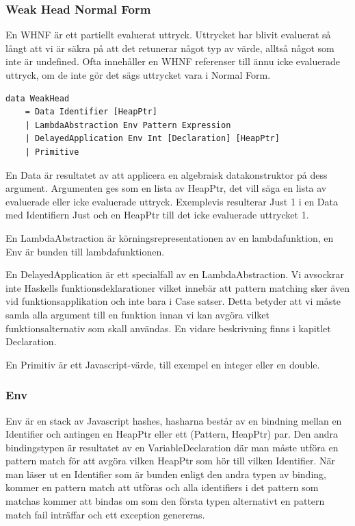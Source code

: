 \subsubsection{Weak Head Normal Form}
En WHNF är ett partiellt evaluerat uttryck. Uttrycket har blivit evaluerat så långt att vi är säkra på att det retunerar något typ av värde, alltså något som inte är undefined. Ofta innehåller en WHNF referenser till ännu icke evaluerade uttryck, om de inte gör det sägs uttrycket vara i Normal Form.

\begin{lstlisting}
data WeakHead 
    = Data Identifier [HeapPtr]
    | LambdaAbstraction Env Pattern Expression
    | DelayedApplication Env Int [Declaration] [HeapPtr]
    | Primitive
\end{lstlisting}

En Data är resultatet av att applicera en algebraisk datakonstruktor på dess argument. Argumenten ges som en lista av HeapPtr, det vill säga en lista av evaluerade eller icke evaluerade uttryck. Exemplevis resulterar Just 1 i en Data med Identifiern Just och en HeapPtr till det icke evaluerade uttrycket 1.

En LambdaAbstraction är körningsrepresentationen av en lambdafunktion, en Env är bunden till lambdafunktionen.

En DelayedApplication är ett specialfall av en LambdaAbstraction. Vi avsockrar inte Haskells funktionsdeklarationer vilket innebär att pattern matching sker även vid funktionsapplikation och inte bara i Case satser. Detta betyder att vi måste samla alla argument till en funktion innan vi kan avgöra vilket funktionsalternativ som skall användas. En vidare beskrivning finns i kapitlet Declaration.

En Primitiv är ett Javascript-värde, till exempel en integer eller en double.

\subsubsection{Env}
Env är en stack av Javascript hashes, hasharna består av en bindning mellan en Identifier och antingen en HeapPtr eller ett (Pattern, HeapPtr) par.  Den andra bindingstypen är resultatet av en VariableDeclaration där man måste utföra en pattern match för att avgöra vilken HeapPtr som hör till vilken Identifier. När man läser ut en Identifier som är bunden enligt den andra typen av binding,  kommer en pattern match att utföras och alla identifiers i det pattern som matchas kommer att bindas om som den första typen alternativt en pattern match fail inträffar och ett exception genereras.

